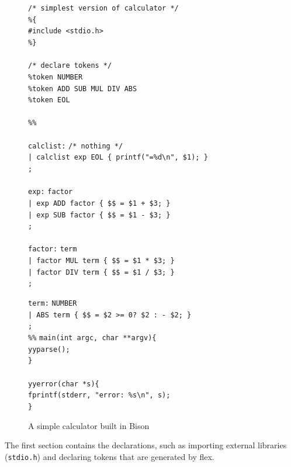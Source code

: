 \documentclass[12pt]{report}
\begin{document}
\begin{figure}[H]
	\begin{tabbing}
	\texttt{/* simplest version of calculator */}\\
	\texttt{\%\{}\\
	\texttt{\#include <stdio.h>}\\
	\texttt{\%\}}\\
	\\
	\texttt{/* declare tokens */}\\
	\texttt{\%token NUMBER}\\
	\texttt{\%token ADD SUB MUL DIV ABS}\\
	\texttt{\%token EOL}\\
	\\
	\texttt{\%\%}\\
	\\
	\texttt{calclist:} \= \texttt{/* nothing */}\\
	\> \texttt{| calclist exp EOL \{ printf("=\%d\textbackslash n", \$1); \}}\\
	\> \texttt{;}\\
	\\
	\texttt{exp:} \= \texttt{factor}\\
	\> \texttt{| exp ADD factor \{ \$\$ = \$1 + \$3; \}}\\
	\> \texttt{| exp SUB factor \{ \$\$ = \$1 - \$3; \}}\\
	\> \texttt{;}\\
	\\
	\texttt{factor:} \= \texttt{term}\\
	\> \texttt{| factor MUL term \{ \$\$ = \$1 * \$3; \}}\\
	\> \texttt{| factor DIV term \{ \$\$ = \$1 / \$3; \}}\\
	\> \texttt{;}
	\end{tabbing}
	\end{figure}
	\begin{figure}[H]
	\begin{tabbing}
	\ContinuedFloat
	\texttt{term:} \= \texttt{NUMBER}\\
	\> \texttt{| ABS term \{ \$\$ = \$2 >= 0? \$2 : - \$2; \}}\\
	\> \texttt{;}\\
	\texttt{\%\%}
	\texttt{main}\=\texttt{(int argc, char **argv)\{}\\
	\> \texttt{yyparse();}\\
	\texttt{\}}\\
	\\
	\texttt{yyerror(char *s)\{}\\
	\> \texttt{fprintf(stderr, "error: \%s\textbackslash n", s);}\\
	\texttt{\}}
	\end{tabbing}
	\caption{A simple calculator built in Bison}\label{fig:bison_example}
\end{figure}
The first section contains the declarations, such as importing external libraries (\texttt{stdio.h}) and declaring tokens that are generated by flex.
\end{document}
